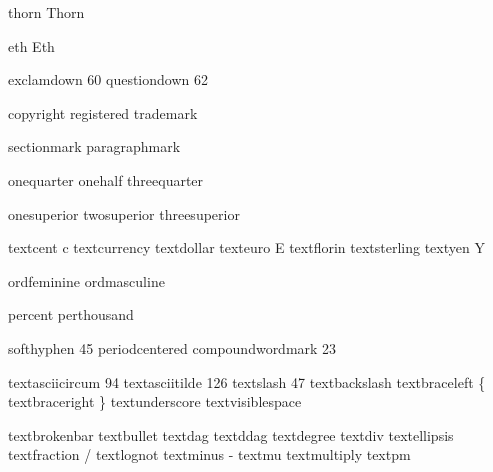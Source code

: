  thorn            {\unknownchar}
 Thorn            {\unknownchar}

 eth              {\unknownchar} %
 Eth              {\Dstroke}     %

 exclamdown        60
 questiondown      62

 copyright        {}
 registered       {}
 trademark        {}

 sectionmark      {}
 paragraphmark    {}

 onequarter       {}
 onehalf          {}
 threequarter     {}

 onesuperior      {}
 twosuperior      {}
 threesuperior    {}

 textcent         {c}
 textcurrency     {\unknownchar}
 textdollar       {\fakedollar}
 texteuro         {E}
 textflorin       {\fakeflorin}
 textsterling     {\fakesterling}
 textyen          {Y}

 ordfeminine      {}
 ordmasculine     {}

 percent          {\fakepercent}
 perthousand      {\fakeperthousand}

 softhyphen        45
 periodcentered   {\hbox{\mathematics\cdot}}
 compoundwordmark  23

 textasciicircum   94
 textasciitilde   126
 textslash         47
 textbackslash    {\tex{}} %
 textbraceleft    {\mathematics\{}
 textbraceright   {\mathematics\}}
 textunderscore   {\fakeunderscore}
 textvisiblespace {\fakevisiblespace}

 textbrokenbar    {\mathematics\vert}
 textbullet       {\mathematics\bullet}
 textdag          {\mathematics\dag}
 textddag         {\mathematics\ddag}
 textdegree       {\mathematics{{}^{\circ}}}
 textdiv          {\mathematics\div}
 textellipsis     {\mathematics\cdots}
 textfraction     {\mathematics/}
 textlognot       {\mathematics\neg}
 textminus        {\mathematics-}
 textmu           {\mathematics\mu}
 textmultiply     {\mathematics\times}
 textpm           {\mathematics\pm}


